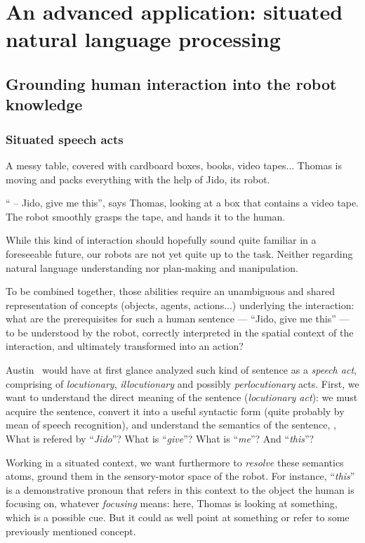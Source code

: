 \chapter{An advanced application: situated natural language processing}
\label{chapter|dialogs}


\section{Grounding human interaction into the robot knowledge}
\label{sect|dialogs}

\subsection{Situated speech acts}
\label{intro_example}

A messy table, covered with cardboard boxes, books, video tapes... Thomas is
moving and packs everything with the help of Jido, its robot.

`` -- Jido, give me this'', says Thomas, looking at a box that contains a video
tape. The robot smoothly grasps the tape, and hands it to the human.

While this kind of interaction should hopefully sound quite familiar in a
foreseeable future, our robots are not yet quite up to the task. Neither
regarding natural language understanding nor plan-making and manipulation.

To be combined together, those abilities require an unambiguous and shared
representation of concepts (objects, agents, actions...) underlying the
interaction: what are the prerequisites for such a
human sentence --- ``Jido, give me this'' --- to be understood by the robot,
correctly interpreted in the spatial context of the interaction, and ultimately
transformed into an action?

Austin~\cite{Austin1962} would have at first glance analyzed such kind of
sentence as a \emph{speech act}, comprising of \emph{locutionary},
\emph{illocutionary} and possibly \emph{perlocutionary} acts. First, we want to
understand the direct meaning of the sentence (\emph{locutionary act}): we must
acquire the sentence, convert it into a useful syntactic form (quite probably
by mean of speech recognition), and understand the semantics of the sentence,
\ie, What is refered by ``\textit{Jido}''? What is ``\textit{give}''? What is
``\textit{me}''? And ``\textit{this}''?

Working in a situated context, we want furthermore to \emph{resolve} these
semantics atoms, \ie ground them in the sensory-motor space of the robot. For
instance, ``\textit{this}'' is a demonstrative pronoun that refers in this
context to the object the human is focusing on, whatever \textit{focusing}
means: here, Thomas is looking at something, which is a possible cue. But it
could as well point at something or refer to some previously mentioned concept. 


